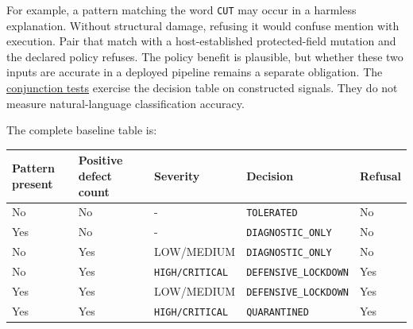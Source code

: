 \documentclass[
  11pt,
]{article}
\newcommand{\passthrough}[1]{#1}
\begin{document}
For example, a pattern matching the word \passthrough{\lstinline!CUT!}
may occur in a harmless explanation. Without structural damage, refusing
it would confuse mention with execution. Pair that match with a
host-established protected-field mutation and the declared policy
refuses. The policy benefit is plausible, but whether these two inputs
are accurate in a deployed pipeline remains a separate obligation. The
\href{https://github.com/dbccpage/the_symbol_game/blob/52cb5457f6c485ba548cfd292f6012a941ed22cf/omega_engine_pfp/tests/mssn_sn_demos/test_demo_immune_soviet.py}{conjunction
tests} exercise the decision table on constructed signals. They do not
measure natural-language classification accuracy.

The complete baseline table is:

\begin{longtable}[]{@{}
  >{\raggedright\arraybackslash}p{}
  >{\raggedright\arraybackslash}p{}
  >{\raggedright\arraybackslash}p{}
  >{\raggedright\arraybackslash}p{}
  >{\raggedright\arraybackslash}p{}@{}}
\toprule\noalign{}
\begin{minipage}[b]{\linewidth}\raggedright
Pattern present
\end{minipage} & \begin{minipage}[b]{\linewidth}\raggedright
Positive defect count
\end{minipage} & \begin{minipage}[b]{\linewidth}\raggedright
Severity
\end{minipage} & \begin{minipage}[b]{\linewidth}\raggedright
Decision
\end{minipage} & \begin{minipage}[b]{\linewidth}\raggedright
Refusal
\end{minipage} \\
\midrule\noalign{}
\endhead
\bottomrule\noalign{}
\endlastfoot
No & No & - & \passthrough{\lstinline!TOLERATED!} & No \\
Yes & No & - & \nolinkurl{DIAGNOSTIC_ONLY} & No \\
No & Yes & LOW/MEDIUM & \nolinkurl{DIAGNOSTIC_ONLY} & No \\
No & Yes & \nolinkurl{HIGH/CRITICAL} & \nolinkurl{DEFENSIVE_LOCKDOWN} &
Yes \\
Yes & Yes & LOW/MEDIUM & \nolinkurl{DEFENSIVE_LOCKDOWN} & Yes \\
Yes & Yes & \nolinkurl{HIGH/CRITICAL} &
\passthrough{\lstinline!QUARANTINED!} & Yes \\
\end{longtable}
\end{document}
